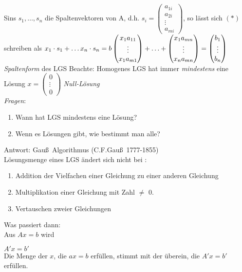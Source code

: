 Sins $s_1,\ldots,s_n$ die Spaltenvektoren von A,
d.h. $s_i = \begin{pmatrix}
a_{1i}\\
a_{2i}\\
\vdots\\
a_{mi}
\end{pmatrix}$, so lässt sich $(*)$ schreiben als $x_1 \cdot s_1 + \ldots x_n \cdot s_n =b\\
\begin{pmatrix}
x_1a_{11}\\
\vdots\\
x_1a_{m1}
\end{pmatrix} + \ldots + \begin{pmatrix}
x_1a_{mn}\\
\vdots\\
x_na_{mn}
\end{pmatrix} = \begin{pmatrix}
b_1\\
\vdots\\
b_n
\end{pmatrix}$\\
\emph{Spaltenform} des LGS
Beachte: Homogenes LGS hat immer \emph{mindestens} eine Lösung $x =\begin{pmatrix}
0\\
\vdots\\
0
\end{pmatrix}$ \emph{Null-Lösung}\\
\emph{Fragen}:
\begin{enumerate}[(1)]
\item Wann hat LGS mindestens eine Lösung?
\item Wenn es Lösungen gibt, wie bestimmt man alle?
\end{enumerate}
Antwort: Gau\ss\ Algorithmus (C.F.Gau\ss\ 1777-1855)\bigskip\\
Lösungsmenge eines LGS ändert sich nicht bei :
\begin{enumerate}[-]
\item Addition der Vielfachen einer Gleichung zu einer anderen Gleichung
\item Multiplikation einer Gleichung mit Zahl $\ne$ 0.
\item Vertauschen zweier Gleichungen
\end{enumerate}
Was passiert dann:\\
Aus $Ax = b$ wird\par$A'x = b'$\\
Die Menge der $x$, die $ax = b$ erfüllen, stimmt mit der überein, die $A'x=b'$ erfüllen.\\
